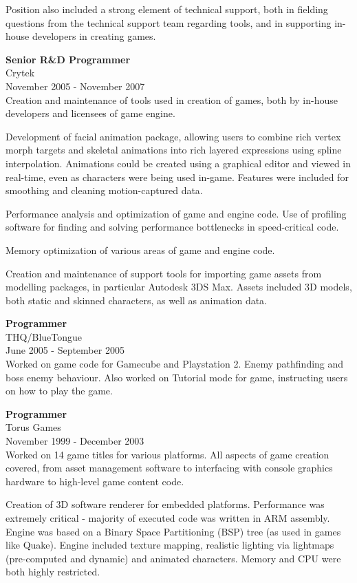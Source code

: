 \documentclass{res}
\begin{document}
\begin{resume}
	Position also included a strong element of technical support, both in fielding
	questions from the technical support team regarding tools, and in supporting
	in-house developers in creating games.

	{\bf Senior R\&D Programmer} \\
	Crytek \\
	November 2005 - November 2007 \\

	Creation and maintenance of tools used in creation of games, both by in-house
	developers and licensees of game engine.

	Development of facial animation package, allowing users to combine rich vertex
	morph targets and skeletal animations into rich layered expressions using
	spline interpolation. Animations could be created using a graphical editor and
	viewed in real-time, even as characters were being used in-game. Features were
	included for smoothing and cleaning motion-captured data.

	Performance analysis and optimization of game and engine code. Use of
	profiling software for finding and solving performance bottlenecks in
	speed-critical code.

	Memory optimization of various areas of game and engine code.

	Creation and maintenance of support tools for importing game assets from
	modelling packages, in particular Autodesk 3DS Max. Assets included 3D models,
	both static and skinned characters, as well as animation data.

	{\bf Programmer} \\
	THQ/BlueTongue \\
	June 2005 - September 2005 \\

	Worked on game code for Gamecube and Playstation 2. Enemy pathfinding and boss
	enemy behaviour. Also worked on Tutorial mode for game, instructing users on
	how to play the game.

	{\bf Programmer} \\
	Torus Games \\
	November 1999 - December 2003 \\

	Worked on 14 game titles for various platforms. All aspects of game creation
	covered, from asset management software to interfacing with console graphics
	hardware to high-level game content code.

	Creation of 3D software renderer for embedded platforms. Performance was
	extremely critical - majority of executed code was written in ARM assembly.
	Engine was based on a Binary Space Partitioning (BSP) tree (as used in games like
	Quake). Engine included texture mapping, realistic lighting via lightmaps
	(pre-computed and dynamic) and animated characters. Memory and CPU were both
	highly restricted.


\end{resume}
\end{document}
